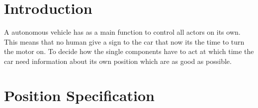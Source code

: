 \section{Introduction}\label{sec:positioningIntroduction}
A autonomous vehicle has as a main function to control all actors on its own.
This means that no human give a sign to the car that now its the time to turn the motor on.
To decide how the single components have to act at which time the car need information about its own position which are as good as possible.


\section{Position Specification}
